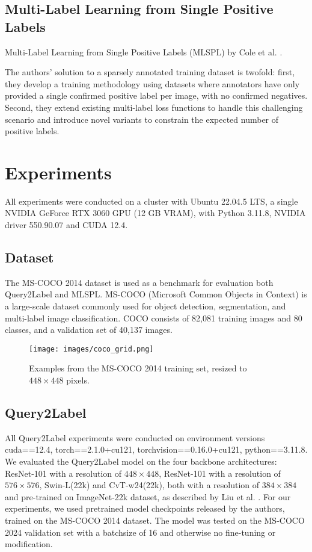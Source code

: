 \documentclass[lettersize,journal]{IEEEtran}
\begin{document}
\subsection{Multi-Label Learning from Single Positive Labels}
Multi-Label Learning from Single Positive Labels (MLSPL) by Cole et al. \cite{mlsp}.

The authors' solution to a sparsely annotated training dataset is twofold: first, they develop a training methodology using datasets where annotators have only provided a single confirmed positive label per image, with no confirmed negatives. Second, they extend existing multi-label loss functions to handle this challenging scenario and introduce novel variants to constrain the expected number of positive labels.





\section{Experiments}
All experiments were conducted on a cluster with Ubuntu 22.04.5 LTS, a single NVIDIA GeForce RTX 3060 GPU (12 GB VRAM), with Python 3.11.8, NVIDIA driver 550.90.07 and CUDA 12.4. 

\subsection{Dataset}
The MS-COCO 2014 \cite{coco14} dataset is used as a benchmark for evaluation both Query2Label and MLSPL. MS-COCO (Microsoft Common Objects in Context) is a large-scale dataset commonly used for object detection, segmentation, and multi-label image classification. COCO consists of 82,081 training images and 80 classes, and a validation set of 40,137 images.

\begin{figure}[t]
    \centering
    \texttt{[image: images/coco\_grid.png]}
    \caption{Examples from the MS-COCO 2014 training set, resized to $448 \times 448$ pixels.}
    \label{fig:coco-examples}
\end{figure}


\subsection{Query2Label}
All Query2Label experiments were conducted on environment versions cuda==12.4, torch==2.1.0+cu121, torchvision==0.16.0+cu121, python==3.11.8.
We evaluated the Query2Label model on the four backbone architectures: ResNet-101 with a resolution of $448\times 448$, ResNet-101 with a resolution of $576\times 576$, Swin-L(22k) and CvT-w24(22k), both with a resolution of $384\times 384$ and pre-trained on ImageNet-22k \cite{imagenet} dataset, as described by Liu et al. \cite{Query2Label}. For our experiments, we used pretrained model checkpoints released by the authors, trained on the MS-COCO 2014 dataset. The model was tested on the MS-COCO 2024 validation set with a batchsize of 16 and otherwise no fine-tuning or modification.
\end{document}
